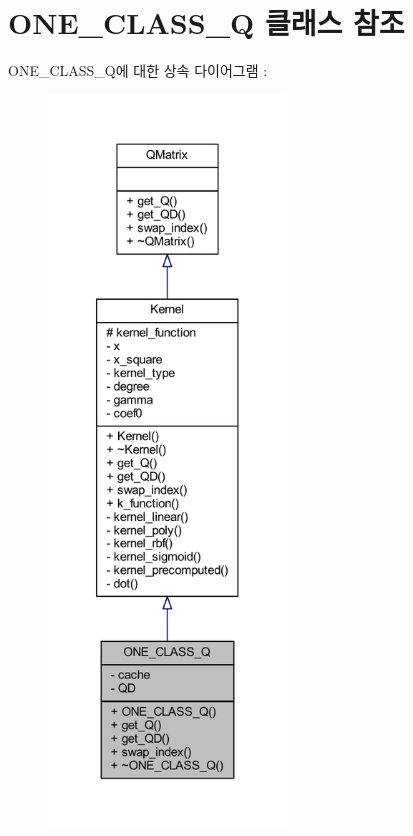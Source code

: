 \hypertarget{class_o_n_e___c_l_a_s_s___q}{\section{O\+N\+E\+\_\+\+C\+L\+A\+S\+S\+\_\+\+Q 클래스 참조}
\label{class_o_n_e___c_l_a_s_s___q}
}


O\+N\+E\+\_\+\+C\+L\+A\+S\+S\+\_\+\+Q에 대한 상속 다이어그램 \+: 
\nopagebreak
\begin{figure}[H]
\begin{center}
\leavevmode
\includegraphics[height=550pt]{class_o_n_e___c_l_a_s_s___q__inherit__graph}
\end{center}
\end{figure}


